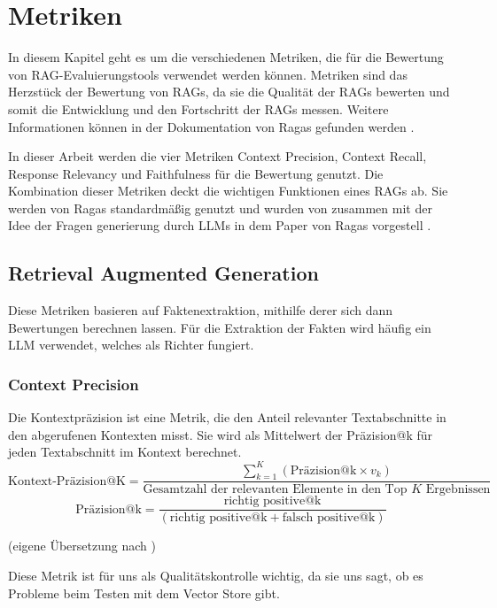 \chapter{Metriken}

\label{chap:formal}
In diesem Kapitel geht es um die verschiedenen Metriken, die für die Bewertung von RAG-Evaluierungstools verwendet werden können.
Metriken sind das Herzstück der Bewertung von RAGs, da sie die Qualität der RAGs bewerten und somit die Entwicklung und den Fortschritt der RAGs messen.
Weitere Informationen können in der Dokumentation von Ragas gefunden werden \cite{ragas_metrics_2025}.

In dieser Arbeit werden die vier Metriken Context Precision, Context Recall, Response Relevancy und Faithfulness für die Bewertung genutzt.
Die Kombination dieser Metriken deckt die wichtigen Funktionen eines RAGs ab. Sie werden von Ragas standardmäßig genutzt und wurden von zusammen mit der Idee der Fragen generierung durch LLMs in dem Paper von Ragas vorgestell \cite{es_ragas_2024}.

\section{Retrieval Augmented Generation}
Diese Metriken basieren auf Faktenextraktion, mithilfe derer sich dann Bewertungen berechnen lassen.
Für die Extraktion der Fakten wird häufig ein LLM verwendet, welches als Richter fungiert.

\subsection{Context Precision}
\begin{plainquote}
Die Kontextpräzision ist eine Metrik, die den Anteil relevanter Textabschnitte in den abgerufenen Kontexten misst.
Sie wird als Mittelwert der Präzision@k für jeden Textabschnitt im Kontext berechnet.
$$\text{Kontext-Präzision@K} = \frac{\sum_{k=1}^{K}{(\text{Präzision@k} \times v_k)}}{\text{Gesamtzahl der relevanten Elemente in den Top } K \text{ Ergebnissen}}$$
$$\text{Präzision@k} = \frac{\text{richtig positive@k}}{(\text{richtig positive@k} + \text{falsch positive@k})}$$

(eigene Übersetzung nach \cite{ragas_context_precision})
\end{plainquote}

Diese Metrik ist für uns als Qualitätskontrolle wichtig, da sie uns sagt, ob es Probleme beim Testen mit dem Vector Store gibt.


